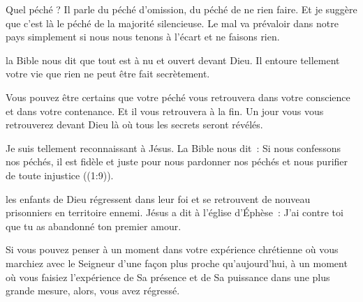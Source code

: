 Quel péché ? Il parle du péché d'omission, du péché de ne rien faire.
 Et je suggère que c'est là le péché de la majorité silencieuse.
 Le mal va prévaloir dans notre pays simplement
 si nous nous tenons à l'écart et ne faisons rien.


la Bible nous dit que tout est à nu et ouvert devant Dieu.
 Il entoure tellement votre vie que rien ne peut être fait secrètement.

Vous pouvez être certains que votre péché vous retrouvera
 dans votre conscience et dans votre contenance.
 Et il vous retrouvera à la fin.
 Un jour vous vous retrouverez devant Dieu
 là où tous les secrets seront révélés.

Je suis tellement reconnaissant à Jésus. La Bible nous dit~:
 \og Si nous confessons nos péchés, il est fidèle et juste
 pour nous pardonner nos péchés et nous purifier
 de toute injustice \fg{} ((1:9)). 

\dvrule






 les enfants de Dieu régressent dans leur foi
 et se retrouvent de nouveau prisonniers en territoire ennemi.
 Jésus a dit à l'église d'Éphèse~:
 \og J'ai contre toi que tu as abandonné ton premier amour. \fg{}

Si vous pouvez penser à un moment dans votre expérience chrétienne
 où vous marchiez avec le Seigneur d'une façon plus proche qu'aujourd'hui,
 à un moment où vous faisiez l'expérience de Sa présence et de Sa puissance
 dans une plus grande mesure, alors, vous avez régressé.


